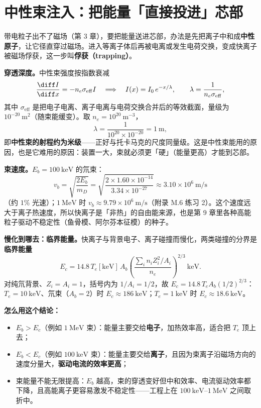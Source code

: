 \section{中性束注入：把能量「直接投进」芯部}

带电粒子出不了磁场（第 3 章），要把能量送进芯部，办法是先把离子中和成\textbf{中性原子}，让它径直穿过磁场。进入等离子体后再被电离或发生电荷交换，变成快离子被磁场俘获，这一步叫\textbf{俘获（trapping）}。

\textbf{穿透深度。}中性束强度按指数衰减
\begin{equation}
\frac{\diff I}{\diff x}=-n_e\sigma_{\mathrm{eff}}I
\quad\Longrightarrow\quad
I(x)=I_0\,e^{-x/\lambda},\qquad
\lambda=\frac{1}{n_e\sigma_{\mathrm{eff}}},
\end{equation}
其中 $\sigma_{\mathrm{eff}}$ 是把电子电离、离子电离与电荷交换合并后的等效截面，量级为 $10^{-20}\ \mathrm{m^2}$（随束能缓变）。取 $n_e=10^{20}\ \mathrm{m^{-3}}$，
\[
\lambda=\frac{1}{10^{20}\times10^{-20}}=1\ \mathrm{m},
\]
即\textbf{中性束的射程约为米级}——正好与托卡马克的尺度同量级。这是中性束能用的原因，也是它难用的原因：装置一大，束就必须更「硬」（能量更高）才能到芯部。

\textbf{束速度。}$E_b=100\ \mathrm{keV}$ 的氘束：
\[
v_b=\sqrt{\frac{2E_b}{m_D}}
=\sqrt{\frac{2\times1.60\times10^{-14}}{3.34\times10^{-27}}}
\approx3.10\times10^{6}\ \mathrm{m/s}
\]
（约 $1\%$ 光速）；$1\ \mathrm{MeV}$ 时 $v_b\approx9.79\times10^{6}\ \mathrm{m/s}$（附录 M.6 练习 2）。这个速度远大于离子热速度，所以快离子是「非热」的自由能来源，也是第 9 章里各种高能粒子驱动不稳定性（鱼骨模、阿尔芬本征模）的种子。

\textbf{慢化到哪去：临界能量。}快离子与背景电子、离子碰撞而慢化，两类碰撞的分界是\textbf{临界能量}
\begin{equation}
E_c=14.8\,T_e[\mathrm{keV}]\,A_b
\left(\frac{\sum_i n_iZ_i^2/A_i}{n_e}\right)^{2/3}\ \mathrm{keV}.
\label{eq:app-m-ecrit}
\end{equation}
对纯氘背景、$Z_i=A_i=1$，括号内为 $1/A_i=1/2$，故 $E_c=14.8\,T_eA_b(1/2)^{2/3}$：$T_e=10\ \mathrm{keV}$、氘束（$A_b=2$）时 $E_c\approx186\ \mathrm{keV}$；$T_e=1\ \mathrm{keV}$ 时 $E_c\approx18.6\ \mathrm{keV}$。

\textbf{怎么用这个结论：}
\begin{itemize}[leftmargin=1.4em]
\item $E_b>E_c$（例如 $1\ \mathrm{MeV}$ 束）：能量主要交给\textbf{电子}，加热效率高，适合把 $T_e$ 顶上去；
\item $E_b<E_c$（例如 $100\ \mathrm{keV}$ 束）：能量主要交给\textbf{离子}，且因为束离子沿磁场方向的速度分量大，\textbf{驱动电流的效率更高}；
\item 束能量不能无限提高：$E_b$ 越高，束的穿透变好但中和效率、电流驱动效率都下降，且高能离子更容易激发不稳定性——工程上在 $100\ \mathrm{keV}$--$1\ \mathrm{MeV}$ 之间取折中。
\end{itemize}

